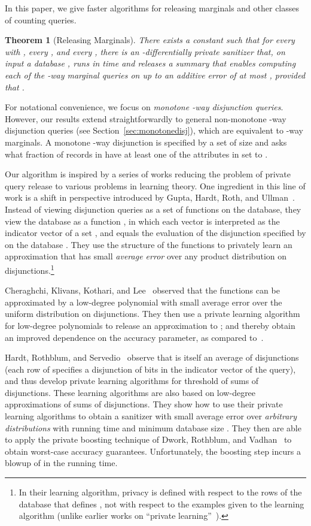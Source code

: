 \documentclass[11pt]{article}
\newtheorem{theorem}{Theorem}[section]
\theoremstyle{definition}
\begin{document}
In this paper, we give faster algorithms for releasing marginals and other classes of counting queries.

\begin{theorem}[Releasing Marginals] \label{thm:main1}
There exists a constant  such that for every  with , every , and every , there is an -differentially private sanitizer that, on input a database , runs in time  and releases a summary that enables computing each of the -way marginal queries on  up to an additive error of at most , provided that .\end{theorem}

For notational convenience, we focus on \emph{monotone -way disjunction queries}. However, our results extend straightforwardly to general non-monotone -way disjunction queries (see Section~\ref{sec:monotonedisj}), which are equivalent to -way marginals.  A monotone -way disjunction is specified by a set  of size  and asks what fraction of records in  have at least one of the attributes in  set to .  

Our algorithm is inspired by a series of works reducing the problem of private query release to various problems in learning theory.  
One ingredient in this line of work is a shift in perspective introduced by Gupta, Hardt, Roth, and Ullman~\cite{GuptaHaRoUl11}. 
Instead of viewing disjunction queries as a set of functions on the database, they view the database as a function , in which each vector  is interpreted as the indicator vector of a set , and  equals the evaluation of the disjunction specified by  on the database .  They use the structure of the functions  to privately learn an approximation  that has small \emph{average error} over any product distribution on disjunctions.\footnote{In their learning algorithm, privacy is defined with respect to the rows of the database  that defines , not with respect to the examples given to the learning algorithm (unlike earlier works on ``private learning''~\cite{KasiviswanathanLeNiRaSm07}). }

Cheraghchi, Klivans, Kothari, and Lee~\cite{CheraghchiKlKoLe12} observed that the functions  can be approximated by a low-degree polynomial with small average error over the uniform distribution on disjunctions. They then use a private learning algorithm for low-degree polynomials to release an approximation to ; and thereby obtain an improved dependence on the accuracy parameter, as compared to~\cite{GuptaHaRoUl11}.  

Hardt, Rothblum, and Servedio~\cite{HardtRoSe12} observe that  is itself an average of disjunctions (each row of  specifies a disjunction of bits in the indicator vector  of the query), and thus develop private learning algorithms for threshold of sums of disjunctions.  These learning algorithms are also based on low-degree approximations of sums of disjunctions.
They show how to use their private learning algorithms to obtain a sanitizer with small average error over \emph{arbitrary distributions} with running time and minimum database size .  They then are able to apply the private boosting technique of Dwork, Rothblum, and Vadhan~\cite{DworkRoVa10} to obtain worst-case accuracy guarantees.  Unfortunately, the boosting step incurs a blowup of  in the running time.
\end{document}
